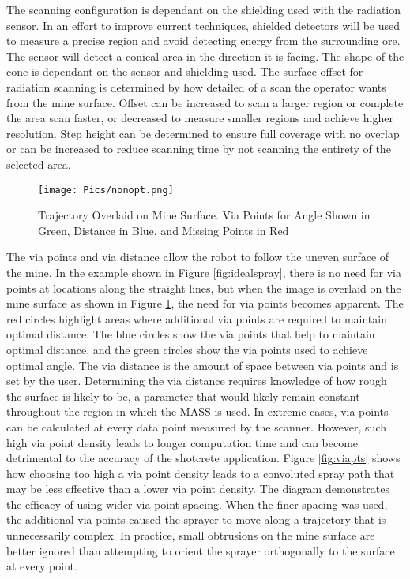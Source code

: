The scanning configuration is dependant on the shielding used with the radiation sensor. In an effort to improve current techniques, shielded detectors will be used to measure a precise region and avoid detecting energy from the surrounding ore. The sensor will detect a conical area in the direction it is facing. The shape of the cone is dependant on the sensor and shielding used. The surface offset for radiation scanning is determined by how detailed of a scan the operator wants from the mine surface. Offset can be increased to scan a larger region or complete the area scan faster, or decreased to measure smaller regions and achieve higher resolution. Step height can be determined to ensure full coverage with no overlap or can be increased to reduce scanning time by not scanning the entirety of the selected area.\\
\begin{figure}[h]
    \centering
    \texttt{[image: Pics/nonopt.png]}
    \caption{Trajectory Overlaid on Mine Surface. Via Points for Angle Shown in Green, Distance in Blue, and Missing Points in Red}
    \label{fig:unidealspray}
\end{figure}

The via points and via distance allow the robot to follow the uneven surface of the mine. In the example shown in Figure \ref{fig:idealspray}, there is no need for via points at locations along the straight lines, but when the image is overlaid on the mine surface as shown in Figure \ref{fig:unidealspray}, the need for via points becomes apparent. The red circles highlight areas where additional via points are required to maintain optimal distance. The blue circles show the via points that help to maintain optimal distance, and the green circles show the via points used to achieve optimal angle. The via distance is the amount of space between via points and is set by the user. Determining the via distance requires knowledge of how rough the surface is likely to be, a parameter that would likely remain constant throughout the region in which the MASS is used. In extreme cases, via points can be calculated at every data point measured by the scanner. However, such high via point density leads to longer computation time and can become detrimental to the accuracy of the shotcrete application. Figure \ref{fig:viapts} shows how choosing too high a via point density leads to a convoluted spray path that may be less effective than a lower via point density. The diagram demonstrates the efficacy of using wider via point spacing. When the finer spacing was used, the additional via points caused the sprayer to move along a trajectory that is unnecessarily complex. In practice, small obtrusions on the mine surface are better ignored than attempting to orient the sprayer orthogonally to the surface at every point.\\

